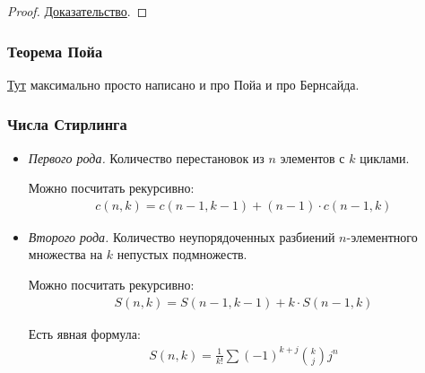 \documentclass{article}
\begin{document}

\begin{proof}
	\href{https://neerc.ifmo.ru/wiki/index.php?title=%D0%9B%D0%B5%D0%BC%D0%BC%D0%B0_%D0%91%D1%91%D1%80%D0%BD%D1%81%D0%B0%D0%B9%D0%B4%D0%B0_%D0%B8_%D0%A2%D0%B5%D0%BE%D1%80%D0%B5%D0%BC%D0%B0_%D0%9F%D0%BE%D0%B9%D0%B0#.D0.A2.D0.B5.D0.BE.D1.80.D0.B5.D0.BC.D0.B0_.D0.9F.D0.BE.D0.B9.D0.B0}{Доказательство}.
\end{proof}


\subsubsection{Теорема Пойа}
\href{https://e-maxx.ru/algo/burnside_polya}{Тут} максимально просто написано и про Пойа и про Бернсайда.

\subsubsection{Числа Стирлинга}
\begin{itemize}
	\item \textit{Первого рода.} Количество перестановок из $n$ элементов с $k$ циклами.
	
	Можно посчитать рекурсивно:
	\begin{align*}
		c(n, k) = c(n - 1, k - 1) + (n - 1)\cdot c(n - 1, k)
	\end{align*} 
	\item \textit{Второго рода.} Количество неупорядоченных разбиений $n$-элементного множества на $k$ непустых подмножеств.
	
	Можно посчитать рекурсивно:
	\begin{align*}
		S(n, k) = S(n - 1, k - 1) + k\cdot S(n - 1, k)
	\end{align*}
	
	Есть явная формула:
	\begin{align*}
		S(n, k) = \frac{1}{k!}\sum\limits(-1)^{k + j}{k \choose j}j^n
	\end{align*}
\end{itemize}
\end{document}
